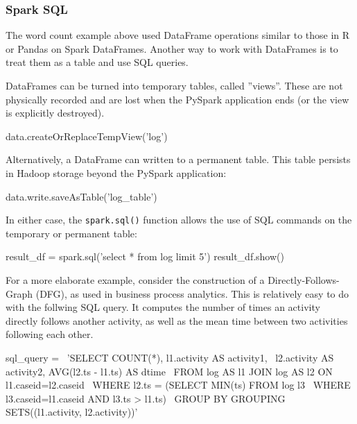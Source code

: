 \subsubsection*{Spark SQL}

The word count example above used DataFrame operations similar to those in R or Pandas on Spark DataFrames. Another way to work with DataFrames is to treat them as a table and use SQL queries.

DataFrames can be turned into temporary tables, called ''views''. These are not physically recorded and are lost when the PySpark application ends (or the view is explicitly destroyed).

\begin{pythoncode}
data.createOrReplaceTempView('log')
\end{pythoncode}

Alternatively, a DataFrame can written to a permanent table. This table persists in Hadoop storage beyond the PySpark application:

\begin{pythoncode}
data.write.saveAsTable('log_table')
\end{pythoncode}

In either case, the \texttt{spark.sql()} function allows the use of SQL commands on the temporary or permanent table:

\begin{samepage}
\begin{pythoncode}
result_df = spark.sql('select * from log limit 5')
result_df.show()
\end{pythoncode}
\end{samepage}

For a more elaborate example, consider the construction of a Directly-Follows-Graph (DFG), as used in business process analytics. This is relatively easy to do with the follwing SQL query. It computes the number of times an activity directly follows another activity, as well as the mean time between two activities following each other. 

\begin{samepage}
\begin{pythoncode}
sql_query = \
'SELECT COUNT(*), l1.activity AS activity1, \
 l2.activity AS activity2, AVG(l2.ts - l1.ts) AS dtime \
  FROM log AS l1 JOIN log AS l2 ON l1.caseid=l2.caseid \
   WHERE l2.ts = (SELECT MIN(ts) FROM log l3 \
    WHERE l3.caseid=l1.caseid AND l3.ts > l1.ts) \
     GROUP BY GROUPING SETS((l1.activity, l2.activity))'
\end{pythoncode}
\end{samepage}

